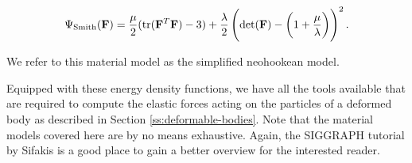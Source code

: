 \begin{equation}\label{eq:smith-neohookean-material-model}
    \Psi_{\text{Smith}}(\mathbf{F}) = \frac{\mu}{2}(\text{tr}(\mathbf{F}^T\mathbf{F}) - 3) + \frac{\lambda}{2}\left(\text{det}(\mathbf{F}) - 
    \left(1 + \frac{\mu}{\lambda}\right)\right)^2.
\end{equation}

\noindent We refer to this material model as the simplified neohookean model.

Equipped with these energy density functions, we have all the tools available that are required to compute the elastic forces acting on the particles 
of a deformed body as described in Section \ref{ss:deformable-bodies}. Note that the material models covered here are by no means exhaustive. Again, the 
SIGGRAPH tutorial by Sifakis \cite{sifakis2012} is a good place to gain a better overview for the interested reader.

